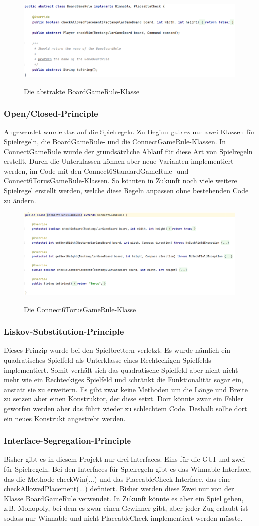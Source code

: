 \documentclass[12pt]{article}
\newcommand{\boardGR}{\includegraphics[width=15cm]{Bilder/BoardGameRule}}
\newcommand{\torus}{\includegraphics[width=15cm]{Bilder/Torus}}
\begin{document}
\begin{figure}[H]
\centering
{\boardGR}
\caption{Die abstrakte BoardGameRule-Klasse}
\label{fig:boardGR}
\end{figure}



\subsubsection{Open/Closed-Principle}
Angewendet wurde das auf die Spielregeln. Zu Beginn gab es nur zwei Klassen für Spielregeln, die BoardGameRule- und die ConnectGameRule-Klassen. In ConnectGameRule wurde der grundsätzliche Ablauf für diese Art von Spielregeln erstellt. Durch die Unterklassen können aber neue Varianten implementiert werden, im Code mit den Connect6StandardGameRule- und Connect6TorusGameRule-Klassen. So könnten in Zukunft noch viele weitere Spielregel erstellt werden, welche diese Regeln anpassen ohne bestehenden Code zu ändern.

\begin{figure}[H]
\centering
{\torus}
\caption{Die Connect6TorusGameRule-Klasse}
\label{fig:torus}
\end{figure}



\subsubsection{Liskov-Substitution-Principle}
Dieses Prinzip wurde bei den Spielbrettern verletzt. Es wurde nämlich ein quadratisches Spielfeld als Unterklasse eines Rechteckigen Spielfelds implementiert. Somit verhält sich das quadratische Spielfeld aber nicht nicht mehr wie ein Rechteckiges Spielfeld und schränkt die Funktionalität sogar ein, anstatt sie zu erweitern.
Es gibt zwar keine Methoden um die Länge und Breite zu setzen aber einen Konstruktor, der diese setzt. Dort könnte zwar ein Fehler geworfen werden aber das führt wieder zu \glqq schlechtem \grqq Code. Deshalb sollte dort ein neues Konstrukt angestrebt werden.



\subsubsection{Interface-Segregation-Principle}
Bisher gibt es in diesem Projekt nur drei Interfaces. Eins für die GUI und zwei für Spielregeln. Bei den Interfaces für Spielregeln gibt es das Winnable Interface, das die Methode checkWin(...) und das PlaceableCheck Interface, das eine checkAllowedPlacement(...) definiert. Bisher werden diese Zwei nur von der Klasse BoardGameRule verwendet. In Zukunft könnte es aber ein Spiel geben, z.B. Monopoly, bei dem es zwar einen Gewinner gibt, aber jeder Zug erlaubt ist sodass nur Winnable und nicht PlaceableCheck implementiert werden müsste.
\end{document}
